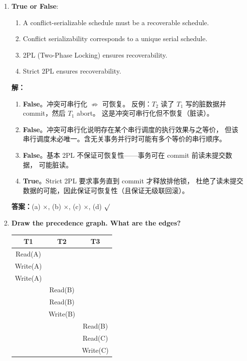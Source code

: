 \documentclass[11pt,a4paper]{article}
\newcommand{\solution}{\par\noindent\textcolor{ansblue}{\textbf{解：}}}
\newcommand{\answer}{\par\noindent\textcolor{ansred}{\textbf{答案：}}}
\begin{document}
\begin{enumerate}[leftmargin=*,itemsep=6pt]

\item \textbf{True or False}:

  \begin{enumerate}[label=(\alph*)]
    \item A conflict-serializable schedule must be a recoverable schedule.
    \item Conflict serializability corresponds to a unique serial schedule.
    \item 2PL (Two-Phase Locking) ensures recoverability.
    \item Strict 2PL ensures recoverability.
  \end{enumerate}

  \solution
  \begin{enumerate}[label=(\alph*)]
    \item \textbf{False}。冲突可串行化 $\not\Rightarrow$ 可恢复。
          反例：$T_2$ 读了 $T_1$ 写的脏数据并 commit，然后 $T_1$ abort。
          这是冲突可串行化但不恢复（脏读）。
    \item \textbf{False}。冲突可串行化说明存在某个串行调度的执行效果与之等价，
          但该串行调度未必唯一。含无关事务并行时可能有多个等价的串行顺序。
    \item \textbf{False}。基本 2PL 不保证可恢复性——事务可在 commit 前读未提交数据，
          可能脏读。
    \item \textbf{True}。Strict 2PL 要求事务直到 commit 才释放排他锁，
          杜绝了读未提交数据的可能，因此保证可恢复性（且保证无级联回滚）。
  \end{enumerate}

  \answer (a) \textcolor{ansred}{$\times$}, (b) \textcolor{ansred}{$\times$},
  (c) \textcolor{ansred}{$\times$}, (d) \textcolor{ansred}{$\surd$}

\item \textbf{Draw the precedence graph. What are the edges?}

  {\small
  \begin{center}
  \begin{tabular}{c|c|c}
  T1 & T2 & T3 \\
  \midrule
  Read(A) & & \\
  Write(A) & & \\
  Write(A) & & \\
  & Read(B) & \\
  & Read(B) & \\
  & Write(B) & \\
  & & Read(B) \\
  & & Read(C) \\
  & & Write(C)
  \end{tabular}
  \end{center}}


\end{enumerate}
\end{document}
